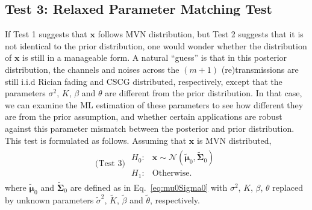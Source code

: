 \documentclass[journal,draftcls,onecolumn,12pt,twoside]{IEEEtran}
\begin{document}
\subsection{Test 3: Relaxed Parameter Matching Test}
If Test 1 suggests that $\mathbf{x}$ follows MVN
distribution, but Test 2 suggests that it is not identical to
the prior distribution, one would wonder whether the distribution of
$\mathbf{x}$ is still in a manageable form. A natural ``guess'' is that in this
posterior distribution, the channels and noises across the $(m+1)$
(re)transmissions are still i.i.d Rician fading and CSCG distributed,
respectively, except that the parameters $\sigma^2$, $K$, $\beta$ and $\theta$
are different from the prior distribution. In that case, we can examine the
ML estimation of these parameters to see how different they are
from the prior assumption, and whether certain applications are robust against
this parameter mismatch between the posterior and prior distribution. This test
is formulated as follows. Assuming that $\mathbf{x}$ is MVN distributed,
\begin{align}
  \mbox{(Test 3) } \begin{array}{ll}H_0: & \mathbf{x}\sim
  \mathcal{N}(\tilde{\bm{\mu}}_0, \tilde{\mathbf{\Sigma}}_0)
  \\
  H_1:
  &
  \mbox{Otherwise.}
  \end{array}
\end{align}
where $\tilde{\bm{\mu}}_0$ and $\tilde{\mathbf{\Sigma}}_0$ are defined as in
Eq.~\eqref{eq:mu0Sigma0} with $\sigma^2$, $K$, $\beta$, $\theta$ replaced by
unknown parameters $\tilde{\sigma}^2$, $\tilde{K}$, $\tilde{\beta}$ and
$\tilde{\theta}$, respectively.
\end{document}
